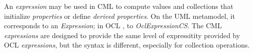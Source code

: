 \begin{definition}
An \emph{expression} may be used in CML to compute values and collections that initialize \emph{properties} or define \emph{derived properties}.
On the UML \cite{uml} metamodel,
it corresponds to an \emph{Expression};
in OCL \cite{ocl}, to \emph{OclExpressionCS}.
The CML \emph{expressions} are designed to provide the same level of
expressitity provided by OCL \emph{expressions},
but the syntax is different, especially for collection operations.
\end{definition}

